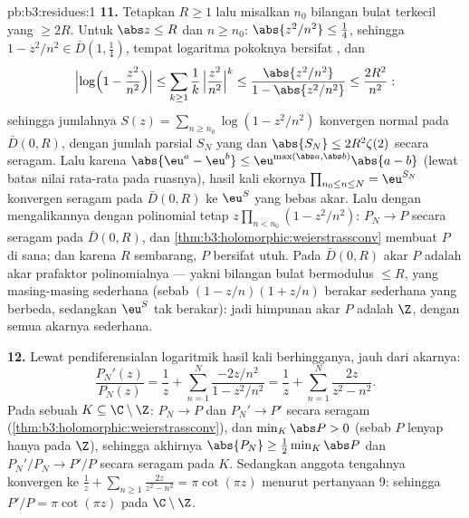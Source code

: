 \begin{solution}{pb:b3:residues:1}
\textbf{11.} Tetapkan $R \geq 1$ lalu misalkan $n_0$ bilangan bulat terkecil
yang $\geq 2R$. Untuk $\abs z \leq R$ dan $n \geq n_0$:
$\abs{z^2/n^2} \leq \frac14$, sehingga $1 - z^2/n^2 \in
\bar D(1, \frac14)$, tempat logaritma pokoknya bersifat
, dan
\[
\Bigl|\log\Bigl(1 - \frac{z^2}{n^2}\Bigr)\Bigr|
\leq \sum_{k\geq1}\frac1k\,\Bigl|\frac{z^2}{n^2}\Bigr|^k
\leq \frac{\abs{z^2/n^2}}{1 - \abs{z^2/n^2}}
\leq \frac{2R^2}{n^2} :
\]
sehingga jumlahnya $S(z) = \sum_{n\geq n_0}\log(1 - z^2/n^2)$ konvergen
normal pada $\bar D(0, R)$, dengan jumlah parsial $S_N$ yang 
dan $\abs{S_N} \leq 2R^2\zeta(2)$ secara seragam. Lalu karena
$\abs{\eu^a - \eu^b} \leq
\eu^{\max(\abs a,\abs b)}\abs{a - b}$ (lewat batas nilai rata-rata pada
ruasnya), hasil kali ekornya $\prod_{n_0\leq n\leq N} =
\eu^{S_N}$ konvergen seragam pada $\bar D(0, R)$ ke
$\eu^S$ yang bebas akar. Lalu dengan mengalikannya dengan polinomial tetap
$z\prod_{n<n_0}(1 - z^2/n^2)$: $P_N \to P$ secara seragam pada
$\bar D(0, R)$, dan
\cref{thm:b3:holomorphic:weierstrassconv} membuat $P$
 di sana; dan karena $R$ sembarang, $P$ bersifat utuh. Pada
$\bar D(0, R)$ akar $P$ adalah akar prafaktor
polinomialnya --- yakni bilangan bulat bermodulus $\leq R$, yang masing-masing sederhana
(sebab $(1 - z/n)(1 + z/n)$ berakar sederhana yang berbeda, sedangkan $\eu^S$
tak berakar): jadi himpunan akar $P$ adalah $\Z$, dengan semua akarnya sederhana.

\textbf{12.} Lewat pendiferensialan logaritmik hasil kali
berhingganya, jauh dari akarnya:
\[
\frac{P_N'(z)}{P_N(z)} = \frac1z +
\sum_{n=1}^{N}\frac{-2z/n^2}{1 - z^2/n^2}
= \frac1z + \sum_{n=1}^{N}\frac{2z}{z^2 - n^2} .
\]
Pada sebuah  $K \subseteq \C\setminus\Z$: $P_N \to P$ dan
$P_N' \to P'$ secara seragam
(\cref{thm:b3:holomorphic:weierstrassconv}), dan $\min_K
\abs P > 0$ (sebab $P$ lenyap hanya pada $\Z$), sehingga akhirnya
$\abs{P_N} \geq \frac12\min_K\abs P$ dan $P_N'/P_N \to
P'/P$ secara seragam pada $K$. Sedangkan anggota tengahnya konvergen ke
$\frac1z + \sum_{n\geq1}\frac{2z}{z^2-n^2} = \pi\cot(\pi z)$
menurut pertanyaan 9: sehingga $P'/P = \pi\cot(\pi z)$ pada
$\C\setminus\Z$.


\end{solution}
